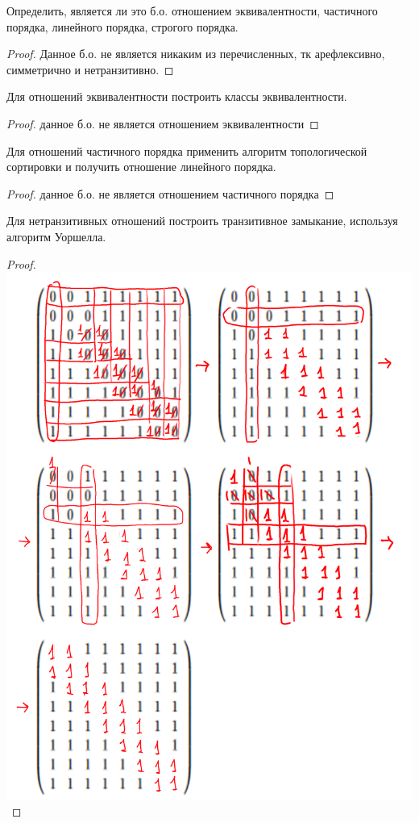 \begin{problem}
	Определить, является ли это б.о. отношением эквивалентности, частичного порядка, линейного порядка, строгого порядка.
\end{problem}

\begin{proof}
	Данное б.о. не является никаким из перечисленных, тк арефлексивно, симметрично и нетранзитивно.
\end{proof}
\begin{problem}
	Для отношений эквивалентности построить классы эквивалентности.
\end{problem}

\begin{proof}
    данное б.о. не является отношением эквивалентности
\end{proof}
\begin{problem}
	Для отношений частичного порядка применить алгоритм топологической сортировки и получить отношение линейного порядка.
\end{problem}

\begin{proof}
    данное б.о. не является отношением частичного порядка
\end{proof}
\begin{problem}
	Для нетранзитивных отношений построить транзитивное замыкание, используя алгоритм Уоршелла.
\end{problem}

\begin{proof}
    \includegraphics{замыкание.png}
\end{proof}